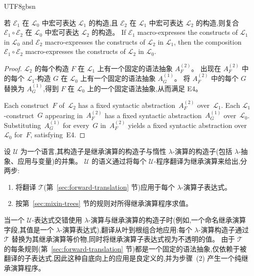 \begin{CJK*}{UTF8}{gbsn}
\begin{lemma}
  \label{lem:macro-composition}
  \ifPaperChinese
  若 $\mathcal{E}_1$ 在 $\mathscr{L}_0$ 中宏可表达 $\mathscr{L}_1$ 的构造,且 $\mathcal{E}_2$ 在 $\mathscr{L}_1$ 中宏可表达 $\mathscr{L}_2$ 的构造,则复合 $\mathcal{E}_1 \circ \mathcal{E}_2$ 在 $\mathscr{L}_0$ 中宏可表达 $\mathscr{L}_2$ 的构造。
  \else
  If $\mathcal{E}_1$ macro-expresses the constructs of
  $\mathscr{L}_1$ in $\mathscr{L}_0$ and
  $\mathcal{E}_2$ macro-expresses the constructs of
  $\mathscr{L}_2$ in $\mathscr{L}_1$, then the composition
  $\mathcal{E}_1 \circ \mathcal{E}_2$ macro-expresses the
  constructs of $\mathscr{L}_2$ in $\mathscr{L}_0$.
  \fi
\end{lemma}

\begin{proof}
  \ifPaperChinese
  $\mathscr{L}_2$ 的每个构造 $F$ 在 $\mathscr{L}_1$ 上有一个固定的语法抽象 $A_F^{(2)}$。
  出现在 $A_F^{(2)}$ 中的每个 $\mathscr{L}_1$-构造 $G$ 在 $\mathscr{L}_0$ 上有一个固定的语法抽象 $A_G^{(1)}$。
  将 $A_F^{(2)}$ 中的每个 $G$ 替换为 $A_G^{(1)}$,得到 $F$ 在 $\mathscr{L}_0$ 上的一个固定语法抽象,从而满足 E4。
  \else
  \begin{sloppypar}
  Each construct~$F$ of~$\mathscr{L}_2$ has a fixed
  syntactic abstraction~$A_F^{(2)}$
  over~$\mathscr{L}_1$.
  Each $\mathscr{L}_1$-construct~$G$ appearing
  in~$A_F^{(2)}$ has a fixed
  syntactic abstraction~$A_G^{(1)}$
  over~$\mathscr{L}_0$.
  Substituting~$A_G^{(1)}$ for every~$G$
  in~$A_F^{(2)}$ yields a fixed syntactic
  abstraction over~$\mathscr{L}_0$ for~$F$,
  satisfying~E4.
  \end{sloppypar}
  \fi
\end{proof}

\begin{definition}
  \label{def:language-universe}
  \ifPaperChinese
  设 $\mathscr{U}$ 为一个语言,其构造子是继承演算的构造子与惰性 $\lambda$-演算的构造子(包括 $\lambda$-抽象、应用与变量)的并集。
  $\mathscr{U}$ 的语义通过将每个 $\mathscr{U}$-程序翻译为继承演算来给出,分两步:
  \begin{enumerate}
    \item 将翻译 $\mathcal{T}$(第~\ref{sec:forward-translation} 节)应用于每个 $\lambda$-演算子表达式。
    \item 按第~\ref{sec:mixin-trees} 节的规则对所得继承演算程序求值。
  \end{enumerate}
  当一个 $\mathscr{U}$-表达式交错使用 $\lambda$-演算与继承演算的构造子时(例如,一个命名继承演算字段,其值是一个 $\lambda$-演算表达式),翻译从叶到根组合地应用:每个 $\lambda$-演算构造子通过 $\mathcal{T}$ 替换为其继承演算等价物,同时将继承演算子表达式视为不透明的值。
  由于 $\mathcal{T}$ 的每条规则(第~\ref{sec:forward-translation} 节)都是一个固定的语法抽象,仅依赖于被翻译的子表达式,因此这种自底向上的应用是良定义的,并为步骤~(2) 产生一个纯继承演算程序。


\end{definition}
\end{CJK*}
